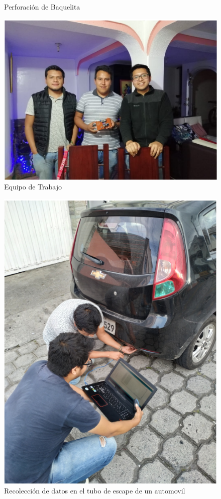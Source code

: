 \documentclass[10pt,a4paper]{article}
\begin{document}
\begin{multicols}{2}
\begin{itemize}
\begin{figure}[H]
\caption{Perforación de Baquelita}
\end{figure}
\begin{figure}[H]
\centering
\includegraphics[scale=0.45]{equiptrab.PNG}
\caption{Equipo de Trabajo}
\end{figure}
\begin{figure}[H]
\centering
\includegraphics[scale=0.6]{datospruebas.PNG}
\caption{Recolección de datos en el tubo de escape de un automovil}
\end{figure}

\end{itemize}
\end{multicols}
\end{document}
